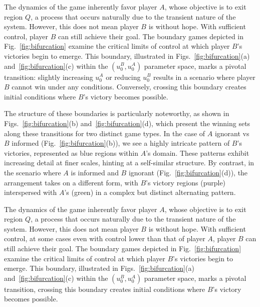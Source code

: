 The dynamics of the game inherently favor player $A$, whose objective is to exit region $Q$, a process that occurs naturally due to the transient nature of the system. However, this does not mean player $B$ is without hope. With sufficient control, player $B$ can still achieve their goal. The boundary games depicted in Fig.~\ref{fig:bifurcation} examine the critical limits of control at which player $B$’s victories begin to emerge. This boundary, illustrated in Figs.~\ref{fig:bifurcation}(a) and~\ref{fig:bifurcation}(c) within the $(u_0^B, u_0^A)$ parameter space, marks a pivotal transition: slightly increasing $u_0^A$ or reducing $u_0^B$ results in a scenario where player $B$ cannot win under any conditions. Conversely, crossing this boundary creates initial conditions where $B$’s victory becomes possible.

The structure of these boundaries is particularly noteworthy, as shown in Figs.~\ref{fig:bifurcation}(b) and~\ref{fig:bifurcation}(d), which present the winning sets along these transitions for two distinct game types. In the case of $A$ ignorant vs $B$ informed (Fig.~\ref{fig:bifurcation}(b)), we see a highly intricate pattern of $B$’s victories, represented as blue regions within $A$’s domain. These patterns exhibit increasing detail at finer scales, hinting at a self-similar structure. By contrast, in the scenario where $A$ is informed and $B$ ignorant (Fig.~\ref{fig:bifurcation}(d)), the arrangement takes on a different form, with $B$’s victory regions (purple) interspersed with $A$’s (green) in a complex but distinct alternating pattern.






The dynamics of the game inherently favor player $A$, whose objective is to exit region $Q$, a process that occurs naturally due to the transient nature of the system. However, this does not mean player $B$ is without hope. With sufficient control, at some cases even with control lower than that of player $A$, player $B$ can still achieve their goal. The boundary games depicted in Fig.~\ref{fig:bifurcation} examine the critical limits of control at which player $B$’s victories begin to emerge. This boundary, illustrated in Figs.~\ref{fig:bifurcation}(a) and~\ref{fig:bifurcation}(c) within the $(u_0^B, u_0^A)$ parameter space, marks a pivotal transition, crossing this boundary creates initial conditions where $B$’s victory becomes possible. 




